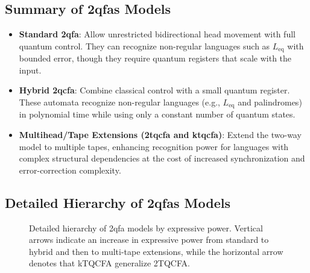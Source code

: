 \subsection*{Summary of \glspl{2qfa} Models}
\begin{itemize}
    \item \textbf{Standard \gls{2qfa}}: Allow unrestricted bidirectional head movement with full quantum control. They can recognize non-regular languages such as \( L_{\text{eq}} \) with bounded error, though they require quantum registers that scale with the input.
    \item \textbf{Hybrid \gls{2qcfa}}: Combine classical control with a small quantum register. These automata recognize non-regular languages (e.g., \( L_{\text{eq}} \) and palindromes) in polynomial time while using only a constant number of quantum states.
    \item \textbf{Multihead/Tape Extensions (\gls{2tqcfa} and \gls{ktqcfa})}: Extend the two-way model to multiple tapes, enhancing recognition power for languages with complex structural dependencies at the cost of increased synchronization and error-correction complexity.
\end{itemize}

\subsection*{Detailed Hierarchy of \glspl{2qfa} Models}
\label{subsec:two-way-hierarchy}

\begin{figure}[ht]
\centering
{}
\caption{Detailed hierarchy of \gls{2qfa} models by expressive power. Vertical arrows indicate an increase in expressive power from standard to hybrid and then to multi-tape extensions, while the horizontal arrow denotes that kTQCFA generalize 2TQCFA.}
\label{fig:two-way-detailed-hierarchy}
\end{figure}
